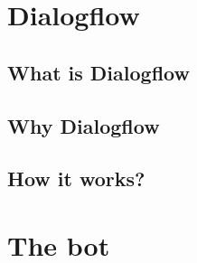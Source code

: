 \documentclass[a4paper,12pt]{report}
\begin{document}
\chapter{Dialogflow}
	\section{What is Dialogflow}
	\section{Why Dialogflow}
	\section{How it works?}

\chapter{The bot}
\end{document}
